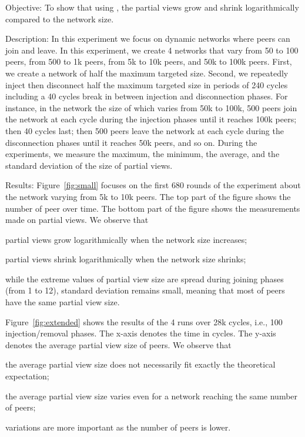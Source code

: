 \begin{asparadesc}
\item [Objective:] To show that using \SPRAY, the partial views grow and shrink
  logarithmically compared to the network size.
\item [Description:] In this experiment we focus on dynamic networks where peers
  can join and leave. In this experiment, we create 4 networks that vary from 50
  to 100 peers, from 500 to 1k peers, from 5k to 10k peers, and 50k to 100k
  peers. First, we create a network of half the maximum targeted size. Second,
  we repeatedly inject then disconnect half the maximum targeted size in periods
  of 240 cycles including a 40 cycles break in between injection and
  disconnection phases. For instance, in the network the size of which varies
  from 50k to 100k, 500 peers join the network at each cycle during the
  injection phases until it reaches 100k peers; then 40 cycles last; then 500
  peers leave the network at each cycle during the disconnection phases until it
  reaches 50k peers, and so on. During the experiments, we measure the maximum,
  the minimum, the average, and the standard deviation of the size of partial
  views.
\item [Results:] Figure~\ref{fig:small} focuses on the first 680 rounds of the
  experiment about the network varying from 5k to 10k peers. The top part of the
  figure shows the number of peer over time. The bottom part of the figure shows
  the measurements made on partial views. We observe that 
  \begin{inparaenum}[(i)]
    \item partial views grow logarithmically when the network size increases;
    \item partial views shrink logarithmically when the network size shrinks;
    \item while the extreme values of partial view size are spread during
      joining phases (from 1 to 12), standard deviation remains small, meaning
      that most of peers have the same partial view size.
  \end{inparaenum}
  Figure~\ref{fig:extended} shows the results of the 4 runs over 28k cycles,
  i.e., 100 injection/removal phases. The x-axis denotes the time in cycles. The
  y-axis denotes the average partial view size of peers. We observe
  that 
  \begin{inparaenum}[(i)]
  \item the average partial view size does not necessarily fit exactly the theoretical
    expectation;
  \item the average partial view size varies even for a network reaching the
    same number of peers;
  \item variations are more important as the number of peers is lower.
  \end{inparaenum}


\end{asparadesc}
